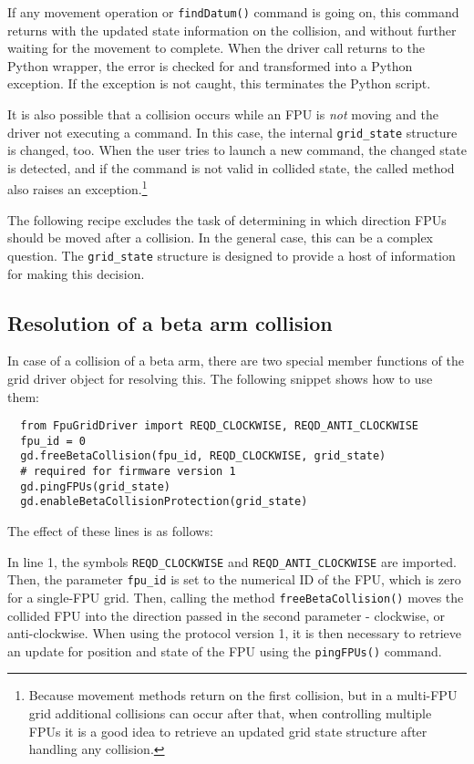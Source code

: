 \documentclass{scrartcl}[12pt,a4paper]
\begin{document}
If any movement operation or \texttt{findDatum()} command is going on,
this command returns with the updated state information on the
collision, and without further waiting for the movement to complete.
When the driver call returns to the Python wrapper, the error is
checked for and transformed into a Python exception. If the exception
is not caught, this terminates the Python script.

It is also possible that a collision occurs while an FPU is \emph{not}
moving and the driver not executing a command.  In this case, the
internal \texttt{grid\_state} structure is changed, too. When the user
tries to launch a new command, the changed state is detected, and if
the command is not valid in collided state, the called method also
raises an exception.\footnote{Because movement methods return on the
  first collision, but in a multi-FPU grid additional collisions can
  occur after that, when controlling multiple FPUs it is a good idea
  to retrieve an updated grid state structure after handling any
  collision.}

The following recipe excludes the task of determining in which
direction FPUs should be moved after a collision.  In the general
case, this can be a complex question. The \texttt{grid\_state}
structure is designed to provide a host of information for making this
decision.

\subsection{Resolution of a beta arm collision}

In case of a collision of a beta arm, there are two special member
functions of the grid driver object for resolving this. The following
snippet shows how to use them:

\begin{verbatim}
  from FpuGridDriver import REQD_CLOCKWISE, REQD_ANTI_CLOCKWISE
  fpu_id = 0
  gd.freeBetaCollision(fpu_id, REQD_CLOCKWISE, grid_state)
  # required for firmware version 1
  gd.pingFPUs(grid_state)
  gd.enableBetaCollisionProtection(grid_state)
\end{verbatim}

The effect of these lines is as follows:

In line 1, the symbols \texttt{REQD\_CLOCKWISE} and
\texttt{REQD\_ANTI\_CLOCKWISE} are imported.  Then, the parameter
\texttt{fpu\_id} is set to the numerical ID of the FPU, which is zero
for a single-FPU grid. Then, calling the method
\texttt{freeBetaCollision()} moves the collided FPU into the direction
passed in the second parameter - clockwise, or anti-clockwise. When
using the protocol version 1, it is then necessary to retrieve an
update for position and state of the FPU using the \texttt{pingFPUs()}
command.
\end{document}

